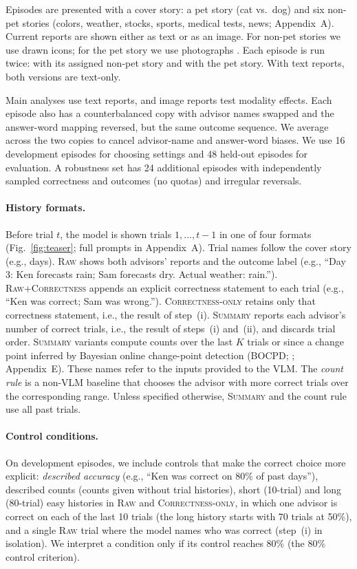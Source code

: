 \documentclass[letterpaper]{article} %
\newcommand{\Raw}{\textsc{Raw}}
\newcommand{\RawCorrectness}{\textsc{Raw+Correctness}}
\newcommand{\CorrectnessOnly}{\textsc{Correctness-only}}
\newcommand{\Summary}{\textsc{Summary}}
\begin{document}
Episodes are presented with a cover story: a pet story (cat vs.\ dog) and six non-pet stories (colors, weather, stocks, sports, medical tests, news; Appendix~A). Current reports are shown either as text or as an image. For non-pet stories we use drawn icons; for the pet story we use photographs \citep{parkhi2012cats}. Each episode is run twice: with its assigned non-pet story and with the pet story. With text reports, both versions are text-only.

Main analyses use text reports, and image reports test modality effects. Each episode also has a counterbalanced copy with advisor names swapped and the answer-word mapping reversed, but the same outcome sequence. We average across the two copies to cancel advisor-name and answer-word biases. We use 16 development episodes for choosing settings and 48 held-out episodes for evaluation. A robustness set has 24 additional episodes with independently sampled correctness and outcomes (no quotas) and irregular reversals.

\paragraph{History formats.} Before trial $t$, the model is shown trials $1,\dots,t-1$ in one of four formats (Fig.~\ref{fig:teaser}; full prompts in Appendix~A). Trial names follow the cover story (e.g., days). \Raw{} shows both advisors' reports and the outcome label (e.g., ``Day 3: Ken forecasts rain; Sam forecasts dry. Actual weather: rain.''). \RawCorrectness{} appends an explicit correctness statement to each trial (e.g., ``Ken was correct; Sam was wrong.''). \CorrectnessOnly{} retains only that correctness statement, i.e., the result of step~(i). \Summary{} reports each advisor's number of correct trials, i.e., the result of steps~(i) and~(ii), and discards trial order. \Summary{} variants compute counts over the last $K$ trials or since a change point inferred by Bayesian online change-point detection (BOCPD; \citealt{adams2007bocpd}; Appendix~E). These names refer to the inputs provided to the VLM. The \emph{count rule} is a non-VLM baseline that chooses the advisor with more correct trials over the corresponding range. Unless specified otherwise, \Summary{} and the count rule use all past trials.

\paragraph{Control conditions.} On development episodes, we include controls that make the correct choice more explicit: \emph{described accuracy} (e.g., ``Ken was correct on 80\% of past days''), described counts (counts given without trial histories), short (10-trial) and long (80-trial) easy histories in \Raw{} and \CorrectnessOnly{}, in which one advisor is correct on each of the last 10 trials (the long history starts with 70 trials at 50\%), and a single \Raw{} trial where the model names who was correct (step~(i) in isolation). We interpret a condition only if its control reaches 80\% (the 80\% control criterion).
\end{document}

